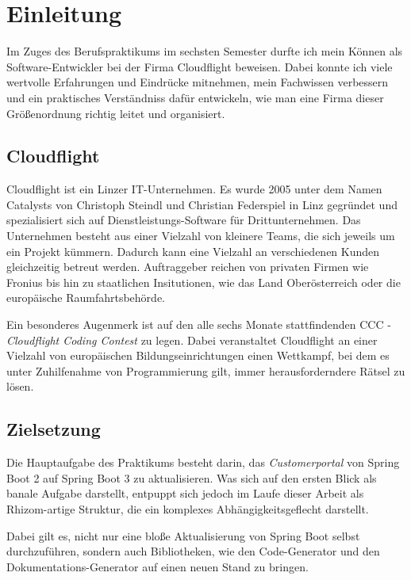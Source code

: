 \chapter{Einleitung}
\label{cha:intro}

Im Zuges des Berufspraktikums im sechsten Semester durfte ich mein Können als Software-Entwickler bei der Firma Cloudflight beweisen. Dabei konnte ich viele wertvolle Erfahrungen und Eindrücke mitnehmen, mein Fachwissen verbessern und ein praktisches Verständniss dafür entwickeln, wie man eine Firma dieser Größenordnung richtig leitet und organisiert. 

\section{Cloudflight}

Cloudflight ist ein Linzer IT-Unternehmen. Es wurde 2005 unter dem Namen Catalysts von Christoph Steindl und Christian Federspiel in Linz gegründet und spezialisiert sich auf Dienstleistungs-Software für Drittunternehmen. Das Unternehmen besteht aus einer Vielzahl von kleinere Teams, die sich jeweils um ein Projekt kümmern. Dadurch kann eine Vielzahl an verschiedenen Kunden gleichzeitig betreut werden. Auftraggeber reichen von privaten Firmen wie Fronius bis hin zu staatlichen Insitutionen, wie das Land Oberösterreich oder die europäische Raumfahrtsbehörde.

Ein besonderes Augenmerk ist auf den alle sechs Monate stattfindenden CCC - \textit{Cloudflight Coding Contest} zu legen. Dabei veranstaltet Cloudflight an einer Vielzahl von europäischen Bildungseinrichtungen einen Wettkampf, bei dem es unter Zuhilfenahme von Programmierung gilt, immer herausforderndere Rätsel zu lösen.

\section{Zielsetzung}

Die Hauptaufgabe des Praktikums besteht darin, das \textit{Customerportal} von Spring Boot 2 auf Spring Boot 3 zu aktualisieren. Was sich auf den ersten Blick als banale Aufgabe darstellt, entpuppt sich jedoch im Laufe dieser Arbeit als Rhizom-artige Struktur, die ein komplexes Abhängigkeitsgeflecht darstellt. 

Dabei gilt es, nicht nur eine bloße Aktualisierung von Spring Boot selbst durchzuführen, sondern auch Bibliotheken, wie den Code-Generator und den Dokumentations-Generator auf einen neuen Stand zu bringen.

